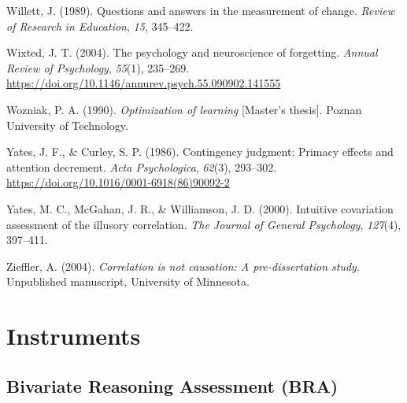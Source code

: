 \documentclass[11pt]{umnthesis}
\newlength{\cslhangindent}
\newenvironment{CSLReferences}[2] %
 {%
  \setlength{\parindent}{0pt}
  \ifodd #1 \everypar{\setlength{\hangindent}{\cslhangindent}}\ignorespaces\fi
  \ifnum #2 > 0
  \setlength{\parskip}{#2\baselineskip}
  \fi
 }%
 {}
\begin{document}
\begin{CSLReferences}{1}{0}
\leavevmode{}%
Willett, J. (1989). Questions and answers in the measurement of change. \emph{Review of Research in Education}, \emph{15}, 345--422.

\leavevmode{}%
Wixted, J. T. (2004). The psychology and neuroscience of forgetting. \emph{Annual Review of Psychology}, \emph{55}(1), 235--269. \url{https://doi.org/10.1146/annurev.psych.55.090902.141555}

\leavevmode{}%
Wozniak, P. A. (1990). \emph{Optimization of learning} {[}Master's thesis{]}. Poznan University of Technology.

\leavevmode{}%
Yates, J. F., \& Curley, S. P. (1986). Contingency judgment: Primacy effects and attention decrement. \emph{Acta Psychologica}, \emph{62}(3), 293--302. \url{https://doi.org/10.1016/0001-6918(86)90092-2}

\leavevmode{}%
Yates, M. C., McGahan, J. R., \& Williamson, J. D. (2000). Intuitive covariation assessment of the illusory correlation. \emph{The Journal of General Psychology}, \emph{127}(4), 397--411.

\leavevmode{}%
Zieffler, A. (2004). \emph{Correlation is not causation: A pre-dissertation study}. Unpublished manuscript, {University of Minnesota}.

\end{CSLReferences}

\setlength{\parindent}{0.20in}
\setlength{\leftskip}{0pt}

\hypertarget{appendix-appendix}{%
\appendix}


\hypertarget{appendix-a}{%
\chapter{Instruments}\label{appendix-a}}


\hypertarget{bivariate-reasoning-assessment-bra}{%
\section*{Bivariate Reasoning Assessment (BRA)}\label{bivariate-reasoning-assessment-bra}}
\end{document}
